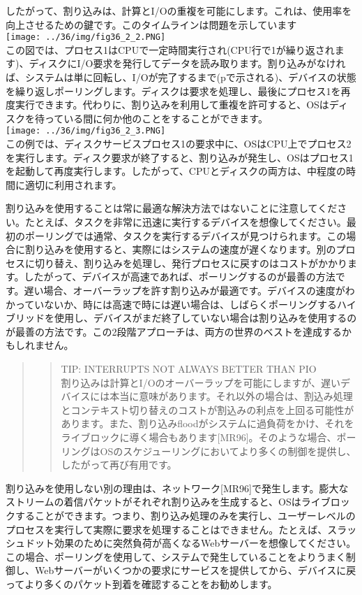したがって、割り込みは、計算とI/Oの重複を可能にします。これは、使用率を向上させるための鍵です。このタイムラインは問題を示しています\\
\texttt{[image: ../36/img/fig36\_2\_2.PNG]}\\
この図では、プロセス1はCPUで一定時間実行され(CPU行で1が繰り返されます)、ディスクにI/O要求を発行してデータを読み取ります。割り込みがなければ、システムは単に回転し、I/Oが完了するまで(pで示される)、デバイスの状態を繰り返しポーリングします。ディスクは要求を処理し、最後にプロセス1を再度実行できます。代わりに、割り込みを利用して重複を許可すると、OSはディスクを待っている間に何か他のことをすることができます。\\
\texttt{[image: ../36/img/fig36\_2\_3.PNG]}\\
この例では、ディスクサービスプロセス1の要求中に、OSはCPU上でプロセス2を実行します。ディスク要求が終了すると、割り込みが発生し、OSはプロセス1を起動して再度実行します。したがって、CPUとディスクの両方は、中程度の時間に適切に利用されます。

割り込みを使用することは常に最適な解決方法ではないことに注意してください。たとえば、タスクを非常に迅速に実行するデバイスを想像してください。最初のポーリングでは通常、タスクを実行するデバイスが見つけられます。この場合に割り込みを使用すると、実際にはシステムの速度が遅くなります。別のプロセスに切り替え、割り込みを処理し、発行プロセスに戻すのはコストがかかります。したがって、デバイスが高速であれば、ポーリングするのが最善の方法です。遅い場合、オーバーラップを許す割り込みが最適です。デバイスの速度がわかっていないか、時には高速で時には遅い場合は、しばらくポーリングするハイブリッドを使用し、デバイスがまだ終了していない場合は割り込みを使用するのが最善の方法です。この2段階アプローチは、両方の世界のベストを達成するかもしれません。

\begin{quote}
\begin{quote}
TIP: INTERRUPTS NOT ALWAYS BETTER THAN PIO\\
割り込みは計算とI/Oのオーバーラップを可能にしますが、遅いデバイスには本当に意味があります。それ以外の場合は、割込み処理とコンテキスト切り替えのコストが割込みの利点を上回る可能性があります。また、割り込みfloodがシステムに過負荷をかけ、それをライブロックに導く場合もあります{[}MR96{]}。そのような場合、ポーリングはOSのスケジューリングにおいてより多くの制御を提供し、したがって再び有用です。
\end{quote}
\end{quote}

割り込みを使用しない別の理由は、ネットワーク{[}MR96{]}で発生します。膨大なストリームの着信パケットがそれぞれ割り込みを生成すると、OSはライブロックすることができます。つまり、割り込み処理のみを実行し、ユーザーレベルのプロセスを実行して実際に要求を処理することはできません。たとえば、スラッシュドット効果のために突然負荷が高くなるWebサーバーを想像してください。この場合、ポーリングを使用して、システムで発生していることをよりうまく制御し、Webサーバーがいくつかの要求にサービスを提供してから、デバイスに戻ってより多くのパケット到着を確認することをお勧めします。

